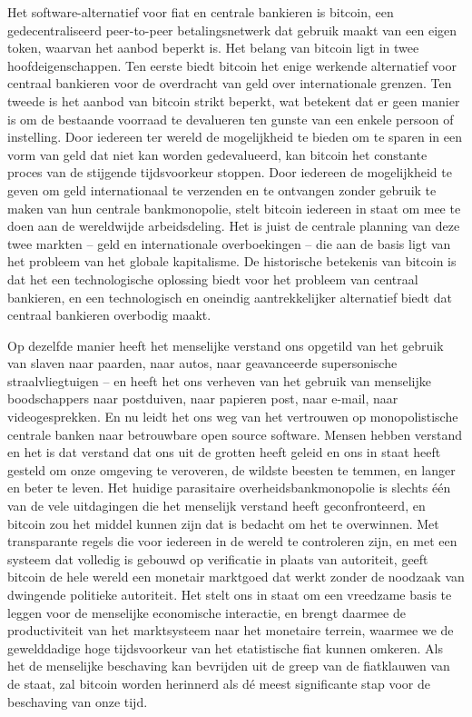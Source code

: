 \documentclass[
  a5paper,
  smalldemyvopaper,11pt,twoside,onecolumn,openright,extrafontsizes,
hidelinks]{memoir}
\begin{document}
Het software-alternatief voor fiat en centrale bankieren is bitcoin, een
gedecentraliseerd peer-to-peer betalingsnetwerk dat gebruik maakt van
een eigen token, waarvan het aanbod beperkt is. Het belang van bitcoin
ligt in twee hoofdeigenschappen. Ten eerste biedt bitcoin het enige
werkende alternatief voor centraal bankieren voor de overdracht van geld
over internationale grenzen. Ten tweede is het aanbod van bitcoin strikt
beperkt, wat betekent dat er geen manier is om de bestaande voorraad te
devalueren ten gunste van een enkele persoon of instelling. Door
iedereen ter wereld de mogelijkheid te bieden om te sparen in een vorm
van geld dat niet kan worden gedevalueerd, kan bitcoin het constante
proces van de stijgende tijdsvoorkeur stoppen. Door iedereen de
mogelijkheid te geven om geld internationaal te verzenden en te
ontvangen zonder gebruik te maken van hun centrale bankmonopolie, stelt
bitcoin iedereen in staat om mee te doen aan de wereldwijde
arbeidsdeling. Het is juist de centrale planning van deze twee markten
-- geld en internationale overboekingen -- die aan de basis ligt van het
probleem van het globale kapitalisme. De historische betekenis van
bitcoin is dat het een technologische oplossing biedt voor het probleem
van centraal bankieren, en een technologisch en oneindig aantrekkelijker
alternatief biedt dat centraal bankieren overbodig maakt.

Op dezelfde manier heeft het menselijke verstand ons opgetild van het
gebruik van slaven naar paarden, naar autos, naar geavanceerde
supersonische straalvliegtuigen -- en heeft het ons verheven van het
gebruik van menselijke boodschappers naar postduiven, naar papieren
post, naar e-mail, naar videogesprekken. En nu leidt het ons weg van het
vertrouwen op monopolistische centrale banken naar betrouwbare open
source software. Mensen hebben verstand en het is dat verstand dat ons
uit de grotten heeft geleid en ons in staat heeft gesteld om onze
omgeving te veroveren, de wildste beesten te temmen, en langer en beter
te leven. Het huidige parasitaire overheidsbankmonopolie is slechts één
van de vele uitdagingen die het menselijk verstand heeft geconfronteerd,
en bitcoin zou het middel kunnen zijn dat is bedacht om het te
overwinnen. Met transparante regels die voor iedereen in de wereld te
controleren zijn, en met een systeem dat volledig is gebouwd op
verificatie in plaats van autoriteit, geeft bitcoin de hele wereld een
monetair marktgoed dat werkt zonder de noodzaak van dwingende politieke
autoriteit. Het stelt ons in staat om een vreedzame basis te leggen voor
de menselijke economische interactie, en brengt daarmee de
productiviteit van het marktsysteem naar het monetaire terrein, waarmee
we de gewelddadige hoge tijdsvoorkeur van het etatistische fiat kunnen
omkeren. Als het de menselijke beschaving kan bevrijden uit de greep van
de fiatklauwen van de staat, zal bitcoin worden herinnerd als dé meest
significante stap voor de beschaving van onze tijd.
\end{document}
